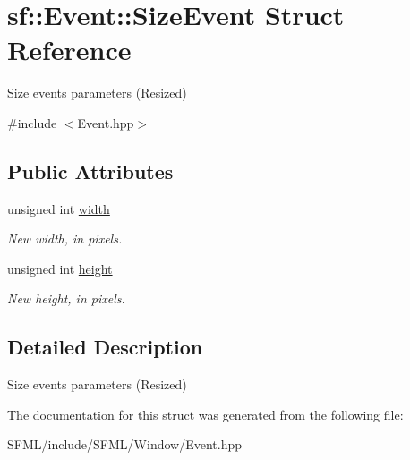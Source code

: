 \hypertarget{structsf_1_1_event_1_1_size_event}{}\section{sf\+:\+:Event\+:\+:Size\+Event Struct Reference}
\label{structsf_1_1_event_1_1_size_event}


Size events parameters (Resized)  




{\ttfamily \#include $<$Event.\+hpp$>$}

\subsection*{Public Attributes}
\begin{DoxyCompactItemize}
\item 
\mbox{\label{structsf_1_1_event_1_1_size_event_a20ea1b78c9bb1604432f8f0067bbfd94}} 
unsigned int \mbox{\hyperlink{structsf_1_1_event_1_1_size_event_a20ea1b78c9bb1604432f8f0067bbfd94}{width}}
\begin{DoxyCompactList}\small\item\em New width, in pixels. \end{DoxyCompactList}\item 
\mbox{\label{structsf_1_1_event_1_1_size_event_af0f76a599d5f48189cb8d78d4e5facdb}} 
unsigned int \mbox{\hyperlink{structsf_1_1_event_1_1_size_event_af0f76a599d5f48189cb8d78d4e5facdb}{height}}
\begin{DoxyCompactList}\small\item\em New height, in pixels. \end{DoxyCompactList}\end{DoxyCompactItemize}


\subsection{Detailed Description}
Size events parameters (Resized) 

\begin{DoxyVerb}\end{DoxyVerb}
 

The documentation for this struct was generated from the following file\+:\begin{DoxyCompactItemize}
\item 
S\+F\+M\+L/include/\+S\+F\+M\+L/\+Window/Event.\+hpp\end{DoxyCompactItemize}
